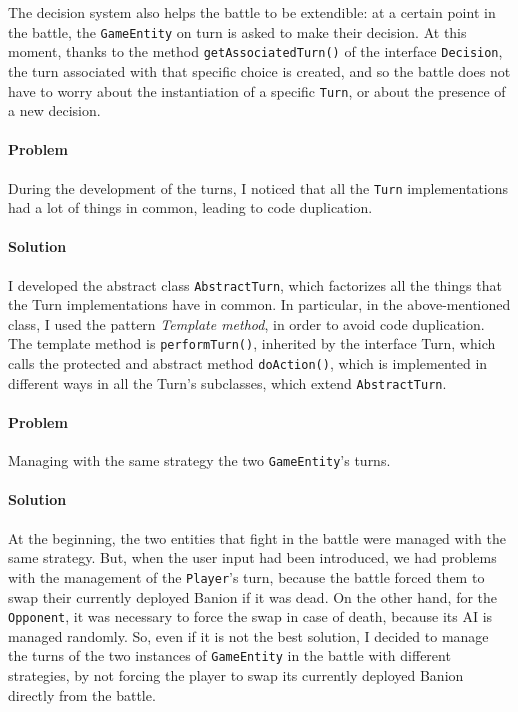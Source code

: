 \documentclass[12pt, a4paper]{report}
\begin{document}
            The decision system also helps the battle to be extendible: at a certain point in the battle, the \verb|GameEntity| on turn is asked
            to make their decision. At this moment, thanks to the method \verb|getAssociatedTurn()| of the interface \verb|Decision|,
            the turn associated with that specific choice is created, and so the battle does not have to worry about the instantiation of a
            specific \verb|Turn|, or about the presence of a new decision.

            \paragraph{Problem}

            During the development of the turns, I noticed that all the \verb|Turn| implementations had a lot of things in
            common, leading to code duplication.

            \paragraph{Solution}

            I developed the abstract class \verb|AbstractTurn|, which factorizes all the things that the Turn implementations have in common.
            In particular, in the above-mentioned class, I used the pattern \emph{Template method}, in order to avoid code duplication.
            The template method is \verb|performTurn()|, inherited by the interface Turn, which calls the protected and abstract 
            method \verb|doAction()|, which is implemented in different ways in all the Turn's subclasses, which extend \verb|AbstractTurn|.

            \paragraph{Problem}

            Managing with the same strategy the two \verb|GameEntity|'s turns.

            \paragraph{Solution}

            At the beginning, the two entities that fight in the battle were managed with the same strategy. But, when the user input had
            been introduced, we had problems with the management of the \verb|Player|'s turn, because the battle forced them to swap their
            currently deployed Banion if it was dead. On the other hand, for the \verb|Opponent|, it was necessary to force the swap 
            in case of death, because its AI is managed randomly. So, even if it is not the best solution, I decided to manage the turns 
            of the two instances of \verb|GameEntity| in the battle with different strategies, by not forcing the player to swap its currently 
            deployed Banion directly from the battle.
\end{document}
